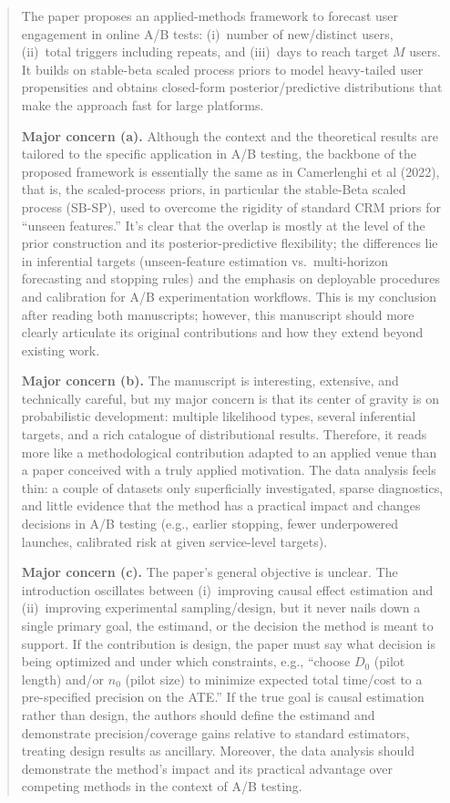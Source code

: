 \begin{quote}
\small
The paper proposes an applied-methods framework to forecast user
engagement in online A/B tests: (i)~number of new/distinct users,
(ii)~total triggers including repeats, and (iii)~days to reach target
$M$ users. It builds on stable-beta scaled process priors to model
heavy-tailed user propensities and obtains closed-form
posterior/predictive distributions that make the approach fast for
large platforms.

\medskip
\textbf{Major concern (a).}
Although the context and the theoretical results are tailored to the
specific application in A/B testing, the backbone of the proposed
framework is essentially the same as in Camerlenghi et al (2022),
that is, the scaled-process priors, in particular the stable-Beta
scaled process (SB-SP), used to overcome the rigidity of standard CRM
priors for ``unseen features.'' It's clear that the overlap is mostly
at the level of the prior construction and its posterior-predictive
flexibility; the differences lie in inferential targets
(unseen-feature estimation vs.\ multi-horizon forecasting and stopping
rules) and the emphasis on deployable procedures and calibration for
A/B experimentation workflows. This is my conclusion after reading
both manuscripts; however, this manuscript should more clearly
articulate its original contributions and how they extend beyond
existing work.

\medskip
\textbf{Major concern (b).}
The manuscript is interesting, extensive, and technically careful, but
my major concern is that its center of gravity is on probabilistic
development: multiple likelihood types, several inferential targets,
and a rich catalogue of distributional results. Therefore, it reads
more like a methodological contribution adapted to an applied venue
than a paper conceived with a truly applied motivation. The data
analysis feels thin: a couple of datasets only superficially
investigated, sparse diagnostics, and little evidence that the method
has a practical impact and changes decisions in A/B testing (e.g.,
earlier stopping, fewer underpowered launches, calibrated risk at
given service-level targets).

\medskip
\textbf{Major concern (c).}
The paper's general objective is unclear. The introduction oscillates
between (i)~improving causal effect estimation and (ii)~improving
experimental sampling/design, but it never nails down a single primary
goal, the estimand, or the decision the method is meant to support.
If the contribution is design, the paper must say what decision is
being optimized and under which constraints, e.g., ``choose $D_0$
(pilot length) and/or $n_0$ (pilot size) to minimize expected total
time/cost to a pre-specified precision on the ATE.'' If the true goal
is causal estimation rather than design, the authors should define the
estimand and demonstrate precision/coverage gains relative to standard
estimators, treating design results as ancillary. Moreover, the data
analysis should demonstrate the method's impact and its practical
advantage over competing methods in the context of A/B testing.


\end{quote}

